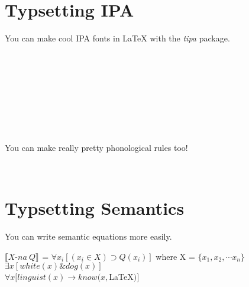 \documentclass{article}
\newcommand{\evaluation}[2][]{\ensuremath{\llbracket #2\rrbracket^{#1}}}	%
\begin{document}
\section{Typsetting IPA}
You can make cool IPA fonts in \LaTeX{} with the \textit{tipa} package.\\
                             \begin{center}
                                            \\
                                       \\    

                                          \\   %
                                                             \\  %
                                     \\  
                                             \\
                                      \\
                             \end{center} 

                          
 You can make really pretty phonological rules too!\\
\begin{center}
\\
 \end{center}


\section{Typsetting Semantics}
You can write semantic equations more easily.\\
\begin{exe}
\ex \evaluation{X\mbox{-}na \ Q} = $ \forall x_i [(x_i \in X) \supset Q(x_i)] $  where X = $ \{x_1, x_2, \cdots x_n\} $\\

\ex $\exists x [white(x) \& dog(x)]$ \\
\ex $\forall x [linguist(x) \rightarrow know(x, $\LaTeX$)]$
\end{exe}
\end{document}
